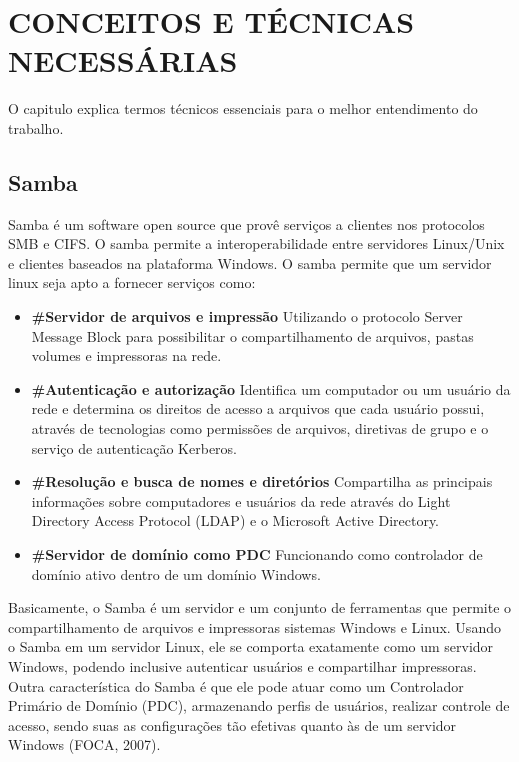 \chapter{CONCEITOS E TÉCNICAS NECESSÁRIAS}

O capitulo explica termos técnicos essenciais para o melhor entendimento do trabalho.

\section{Samba}

Samba é um software open source que provê serviços a clientes nos protocolos SMB e CIFS.
O samba permite a interoperabilidade entre servidores Linux/Unix e clientes baseados na
plataforma Windows.
O samba permite que um servidor linux seja apto a fornecer serviços como:
  \begin{itemize}
    \item \textbf{\#Servidor de arquivos e impressão} Utilizando o protocolo Server Message Block para possibilitar o compartilhamento de arquivos, pastas volumes e impressoras na rede.

    \item \textbf{\#Autenticação e autorização} Identifica um computador ou um usuário da rede e determina os direitos de acesso a arquivos que cada usuário possui, através de tecnologias como permissões de arquivos, diretivas de grupo e o serviço de autenticação Kerberos.

    \item \textbf{\#Resolução e busca de nomes e diretórios} Compartilha as principais informações sobre computadores e usuários da rede através do Light Directory Access Protocol (LDAP) e o Microsoft Active Directory.

    \item \textbf{\#Servidor de domínio como PDC} Funcionando como controlador de domínio ativo dentro de um domínio Windows.
  \end{itemize}

Basicamente, o Samba é um servidor e um conjunto de ferramentas que permite o compartilhamento de arquivos e impressoras sistemas Windows e Linux. Usando o Samba em um servidor Linux, ele se comporta exatamente como um servidor Windows, podendo inclusive autenticar usuários e compartilhar impressoras. Outra característica do Samba é que ele pode atuar como um Controlador Primário de Domínio (PDC), armazenando perfis de usuários, realizar controle de acesso, sendo suas as configurações tão efetivas quanto às de um servidor Windows (FOCA, 2007).

